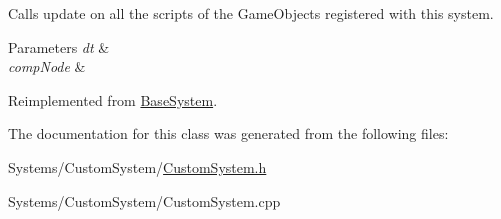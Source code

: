 Calls update on all the scripts of the Game\+Objects registered with this system. 


\begin{DoxyParams}{Parameters}
{\em dt} & \\
\hline
{\em comp\+Node} & \\
\hline
\end{DoxyParams}


Reimplemented from \hyperlink{classBaseSystem_a465191589a1ef8b8f3a8e20fa4656d47}{Base\+System}.



The documentation for this class was generated from the following files\+:\begin{DoxyCompactItemize}
\item 
Systems/\+Custom\+System/\hyperlink{CustomSystem_8h}{Custom\+System.\+h}\item 
Systems/\+Custom\+System/Custom\+System.\+cpp\end{DoxyCompactItemize}
